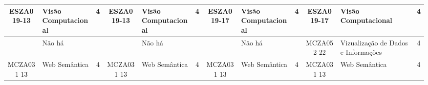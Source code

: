 \documentclass[a4paper]{article}
\begin{document}
\begin{landscape}
{\begin{longtable}{|c|p{.2\textheight}|c||c|p{.2\textheight}|c||c|p{.2\textheight}|c||c|p{.2\textheight}|c|}
ESZA019-13 & Visão Computacional & 4 &
ESZA019-13 & Visão Computacional & 4 &
ESZA019-17 & Visão Computacional & 4 &
ESZA019-17 & Visão Computacional & 4\\ \hline

& Não há & &
& Não há & & 
& Não há & & 
MCZA052-22 & Vizualização de Dados e Informações & 4\\ \hline

MCZA031-13 & Web Semântica & 4 &
MCZA031-13 & Web Semântica & 4 &
MCZA031-13 & Web Semântica & 4 &
MCZA031-13 & Web Semântica & 4\\ \hline
    
\end{longtable}
}
\end{landscape}
\end{document}
